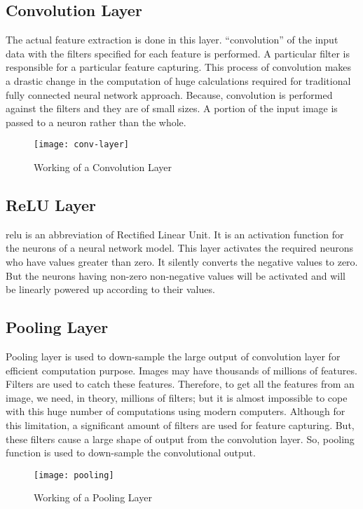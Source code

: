         \subsection{Convolution Layer}
            The actual feature extraction is done in this layer. ``convolution'' of the input data with the filters specified for each feature is performed\cite{kim2017convolutional}. A particular filter is responsible for a particular feature capturing\cite{kim2017convolutional}. This process of convolution makes a drastic change in the computation of huge calculations required for traditional fully connected neural network approach. Because, convolution is performed against the filters and they are of small sizes. A portion of the input image is passed to a neuron rather than the whole\cite{kim2017convolutional}. 
            \begin{figure}[h]
                \centering
                \texttt{[image: conv-layer]}
                \caption{Working of a Convolution Layer}
                \label{fig:conv_layer}
            \end{figure}
    
        \subsection{ReLU Layer}
            \gls{relu} is an abbreviation of Rectified Linear Unit. It is an activation function for the neurons of a neural network model\cite{agarap2018deep}. This layer activates the required neurons who have values greater than zero. It silently converts the negative values to zero. But the neurons having non-zero non-negative values will be activated and will be linearly powered up according to their values\cite{agarap2018deep}.
    
        \subsection{Pooling Layer}
            Pooling layer is used to down-sample the large output of convolution layer for efficient computation purpose\cite{yu2014mixed}. Images may have thousands of millions of features. Filters are used to catch these features\cite{kim2017convolutional}. Therefore, to get all the features from an image, we need, in theory, millions of filters; but it is almost impossible to cope with this huge number of computations using modern computers. Although for this limitation, a significant amount of filters are used for feature capturing\cite{kim2017convolutional}. But, these filters cause a large shape of output from the convolution layer. So, pooling function is used to down-sample the convolutional output\cite{yu2014mixed}.      
            \begin{figure}[h]
                \centering
                \texttt{[image: pooling]}
                \caption{Working of a Pooling Layer}
                \label{fig:pooling}
            \end{figure}
    
